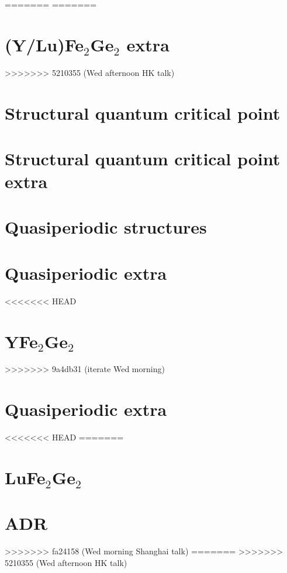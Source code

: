 =======
=======
\section{(Y/Lu)Fe$_2$Ge$_2$ extra}


>>>>>>> 5210355 (Wed afternoon HK talk)

\section{Structural quantum critical point}

\section{Structural quantum critical point extra}

\section{Quasiperiodic structures}


\section{Quasiperiodic extra}


%
%



<<<<<<< HEAD
\section{YFe$_2$Ge$_2$}
>>>>>>> 9a4db31 (iterate Wed morning)





\section{Quasiperiodic extra}


%
%




<<<<<<< HEAD
=======
\section{LuFe$_2$Ge$_2$}

% 
\section{ADR}

>>>>>>> fa24158 (Wed morning Shanghai talk)
=======
>>>>>>> 5210355 (Wed afternoon HK talk)

